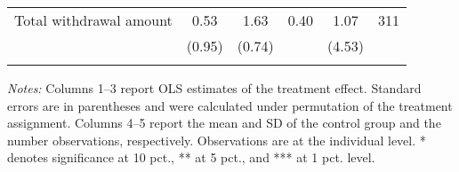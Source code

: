 \begin{table}[h]
{\begin{threeparttable}
\begin{tabular}{l*{5}{c}}
Total withdrawal amount&     0.53&     1.63&     0.40&     1.07&      311\\
          &   (0.95)&   (0.74)&         &   (4.53)&         \\
          &         &         &         &         &         \\
\bottomrule \end{tabular} \begin{tablenotes}[flushleft] \footnotesize \item \emph{Notes:} Columns 1--3 report OLS estimates of the treatment effect. Standard errors are in parentheses and were calculated under permutation of the treatment assignment. Columns 4--5 report the mean and SD of the control group and the number observations, respectively. Observations are at the individual level. * denotes significance at 10 pct., ** at 5 pct., and *** at 1 pct. level. \end{tablenotes} \end{threeparttable} } \end{table}

